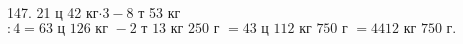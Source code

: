 147. 21 ц 42 кг$\cdot3-8$ т 53 кг$:4=63\text{ ц }126\text{ кг }-2\text{ т }13\text{ кг }250\text{ г }=43\text{ ц }112\text{ кг }750\text{ г }=4412\text{ кг }750\text{ г}.$\\
